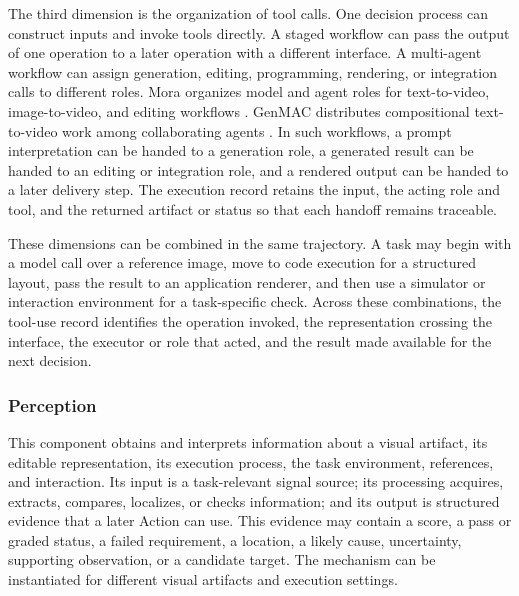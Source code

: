 The third dimension is the organization of tool calls. One decision process can construct inputs and invoke tools directly. A staged workflow can pass the output of one operation to a later operation with a different interface. A multi-agent workflow can assign generation, editing, programming, rendering, or integration calls to different roles. Mora organizes model and agent roles for text-to-video, image-to-video, and editing workflows \cite{yuan2024mora}. GenMAC distributes compositional text-to-video work among collaborating agents \cite{huang2024genmac}. In such workflows, a prompt interpretation can be handed to a generation role, a generated result can be handed to an editing or integration role, and a rendered output can be handed to a later delivery step. The execution record retains the input, the acting role and tool, and the returned artifact or status so that each handoff remains traceable.

These dimensions can be combined in the same trajectory. A task may begin with a model call over a reference image, move to code execution for a structured layout, pass the result to an application renderer, and then use a simulator or interaction environment for a task-specific check. Across these combinations, the tool-use record identifies the operation invoked, the representation crossing the interface, the executor or role that acted, and the result made available for the next decision.


\subsubsection{Perception}

This component obtains and interprets information about a visual artifact, its editable representation, its execution process, the task environment, references, and interaction. Its input is a task-relevant signal source; its processing acquires, extracts, compares, localizes, or checks information; and its output is structured evidence that a later Action can use. This evidence may contain a score, a pass or graded status, a failed requirement, a location, a likely cause, uncertainty, supporting observation, or a candidate target. The mechanism can be instantiated for different visual artifacts and execution settings.

